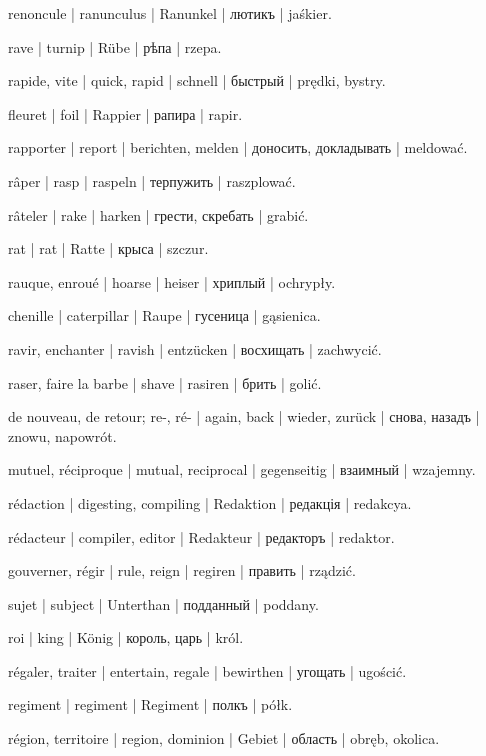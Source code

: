 \begin{outdent}{1em}
renoncule | ranunculus | Ranunkel | лютикъ | jaśkier.

rave | turnip | Rübe | рѣпа | rzepa.

rapide, vite | quick, rapid | schnell | быстрый | prędki, bystry.

fleuret | foil | Rappier | рапира | rapir.

rapporter | report | berichten, melden | доносить,
докладывать | meldować.

râper | rasp | raspeln | терпужить | raszplować.

râteler | rake | harken | грести, скребать | grabić.

rat | rat | Ratte | крыса | szczur.

rauque, enroué | hoarse | heiser | хриплый | ochrypły.

chenille | caterpillar | Raupe | гусеница | gąsienica.

ravir, enchanter | ravish | entzücken | восхищать | zachwycić.

raser, faire la barbe | shave | rasiren | брить | golić.

de nouveau, de retour; re-, ré- | again, back | wieder, zurück | снова, назадъ | znowu, napowrót.

mutuel, réciproque | mutual, reciprocal | gegenseitig | взаимный | wzajemny.

rédaction | digesting, compiling | Redaktion | редакція | redakcya.

rédacteur | compiler, editor | Redakteur | редакторъ | redaktor.

gouverner, régir | rule, reign | regiren | править | rządzić.

\uvsubentry{}
sujet | subject | Unterthan | подданный | poddany.

roi | king | König | король, царь | król.

régaler, traiter | entertain, regale | bewirthen | угощать | ugościć.

regiment | regiment | Regiment | полкъ | półk.

région, territoire | region, dominion | Gebiet | область | obręb, okolica.


\end{outdent}
